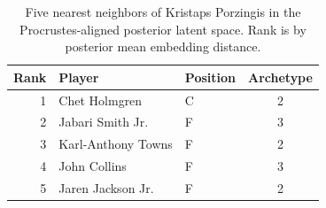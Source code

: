 \begin{table}[htbp]
  \centering\small
  \begin{tabular}{rllc}
    \toprule
    Rank & Player & Position & Archetype \\
    \midrule
    1 & Chet Holmgren & C & 2 \\
    2 & Jabari Smith Jr. & F & 3 \\
    3 & Karl-Anthony Towns & F & 2 \\
    4 & John Collins & F & 3 \\
    5 & Jaren Jackson Jr. & F & 2 \\
    \bottomrule
  \end{tabular}
  \caption{Five nearest neighbors of Kristaps Porzingis in the Procrustes-aligned posterior latent space. Rank is by posterior mean embedding distance.}
  \label{tab:Kristaps_Porzingis_neighbors}
\end{table}

